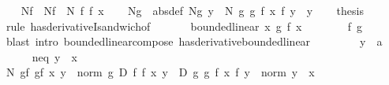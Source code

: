 \begin{isabellebody}
\ \ \isamarkupfalse%
\ Nf\ \ {\isachardoublequoteopen}Nf\ {\isacharequal}{\kern0pt}\ {\isacharquery}{\kern0pt}N\ f\ f{\isacharprime}{\kern0pt}\ x{\isachardoublequoteclose}\isanewline
\ \ \isamarkupfalse%
\ Ng\ \ {\isacharbrackleft}{\kern0pt}abs{\isacharunderscore}{\kern0pt}def{\isacharbrackright}{\kern0pt}{\isacharcolon}{\kern0pt}\ {\isachardoublequoteopen}Ng\ y\ {\isacharequal}{\kern0pt}\ {\isacharquery}{\kern0pt}N\ g\ g{\isacharprime}{\kern0pt}\ {\isacharparenleft}{\kern0pt}f\ x{\isacharparenright}{\kern0pt}\ {\isacharparenleft}{\kern0pt}f\ y{\isacharparenright}{\kern0pt}{\isachardoublequoteclose}\ \ y\isanewline
\isanewline
\ \ \isamarkupfalse%
\ {\isacharquery}{\kern0pt}thesis\isanewline
\ \ \isamarkupfalse%
\ {\isacharparenleft}{\kern0pt}rule\ has{\isacharunderscore}{\kern0pt}derivativeI{\isacharunderscore}{\kern0pt}sandwich{\isacharbrackleft}{\kern0pt}of\ {}{\isacharbrackright}{\kern0pt}{\isacharparenright}{\kern0pt}\isanewline
\ \ \ \ \isamarkupfalse%
\ {\isachardoublequoteopen}bounded{\isacharunderscore}{\kern0pt}linear\ {\isacharparenleft}{\kern0pt}{\isasymlambda}x{\isachardot}{\kern0pt}\ g{\isacharprime}{\kern0pt}\ {\isacharparenleft}{\kern0pt}f{\isacharprime}{\kern0pt}\ x{\isacharparenright}{\kern0pt}{\isacharparenright}{\kern0pt}{\isachardoublequoteclose}\isanewline
\ \ \ \ \ \ \isamarkupfalse%
\ f\ g\ \isamarkupfalse%
\ {\isacharparenleft}{\kern0pt}blast\ intro{\isacharcolon}{\kern0pt}\ bounded{\isacharunderscore}{\kern0pt}linear{\isacharunderscore}{\kern0pt}compose\ has{\isacharunderscore}{\kern0pt}derivative{\isacharunderscore}{\kern0pt}bounded{\isacharunderscore}{\kern0pt}linear{\isacharparenright}{\kern0pt}\isanewline
\ \ \isamarkupfalse%
\isanewline
\ \ \ \ \isamarkupfalse%
\ y\ {\isacharcolon}{\kern0pt}{\isacharcolon}{\kern0pt}\ {\isacharprime}{\kern0pt}a\isanewline
\ \ \ \ \isamarkupfalse%
\ neq{\isacharcolon}{\kern0pt}\ {\isachardoublequoteopen}y\ {\isasymnoteq}\ x{\isachardoublequoteclose}\isanewline
\ \ \ \ \isamarkupfalse%
\ {\isachardoublequoteopen}{\isacharquery}{\kern0pt}N\ {\isacharquery}{\kern0pt}gf\ {\isacharquery}{\kern0pt}gf{\isacharprime}{\kern0pt}\ x\ y\ {\isacharequal}{\kern0pt}\ norm\ {\isacharparenleft}{\kern0pt}g{\isacharprime}{\kern0pt}\ {\isacharparenleft}{\kern0pt}{\isacharquery}{\kern0pt}D\ f\ f{\isacharprime}{\kern0pt}\ x\ y{\isacharparenright}{\kern0pt}\ {\isacharplus}{\kern0pt}\ {\isacharquery}{\kern0pt}D\ g\ g{\isacharprime}{\kern0pt}\ {\isacharparenleft}{\kern0pt}f\ x{\isacharparenright}{\kern0pt}\ {\isacharparenleft}{\kern0pt}f\ y{\isacharparenright}{\kern0pt}{\isacharparenright}{\kern0pt}\ {\isacharslash}{\kern0pt}\ norm\ {\isacharparenleft}{\kern0pt}y\ {\isacharminus}{\kern0pt}\ x{\isacharparenright}{\kern0pt}{\isachardoublequoteclose}\isanewline

\end{isabellebody}
